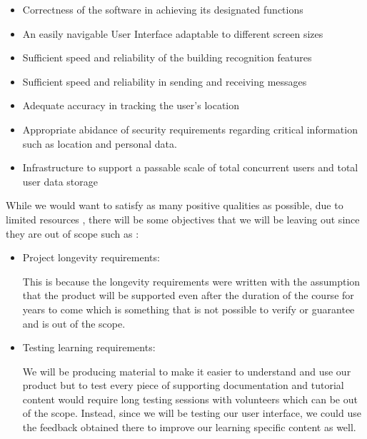\documentclass[12pt, titlepage]{article}
\begin{document}
\begin{itemize}

    \item  Correctness of the software in achieving its designated functions

    \item An easily navigable User Interface adaptable to different screen sizes

    \item Sufficient speed and reliability of the building recognition features

    \item Sufficient speed and reliability in sending and receiving messages

    \item Adequate accuracy in tracking the user's location

    \item Appropriate abidance of security requirements regarding critical information such as location and personal data.

    \item Infrastructure to support a passable scale of total concurrent users and total user data storage

    \end{itemize}



While we would want to satisfy as many positive qualities as possible, due to limited resources , there will be some objectives that we will be leaving out since they are out of scope such as :

\begin{itemize}
    \item  Project longevity requirements:

    This is because the longevity requirements were written with the assumption that the product will be supported even after the duration of the course for years to come which is something that is not possible to verify or guarantee and is out of the scope.

    \item  Testing learning requirements:

    We will be producing material to make it easier to understand and use our product but to test every piece of supporting documentation and tutorial content would require long testing sessions with volunteers which can be out of the scope. Instead, since we will be testing our user interface, we could use the feedback obtained there to improve our learning specific content as well.
    
\end{itemize}
\end{document}

